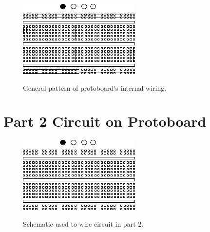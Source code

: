 \documentclass[twocolumn,english]{IEEEtran}
\theoremstyle{plain}
\theoremstyle{plain}
\begin{document}
\begin{figure}[h!]
  \begin{centering}
  \begin{center}
  \includegraphics[width=\linewidth]{./Images/proto.png}
  \label{fig:proto}
  \caption{General pattern of protoboard's internal wiring.}
  \end{center}
  \par\end{centering}
  \end{figure}

\section{Part 2 Circuit on Protoboard}

\begin{figure}[h!]
  \begin{centering}
  \begin{center}
  \includegraphics[width=\linewidth]{./Images/proto_2.png}
  \label{fig:proto2}
  \caption{Schematic used to wire circuit in part 2.}
  \end{center}
  \par\end{centering}
  \end{figure}

%
%
\end{document}
